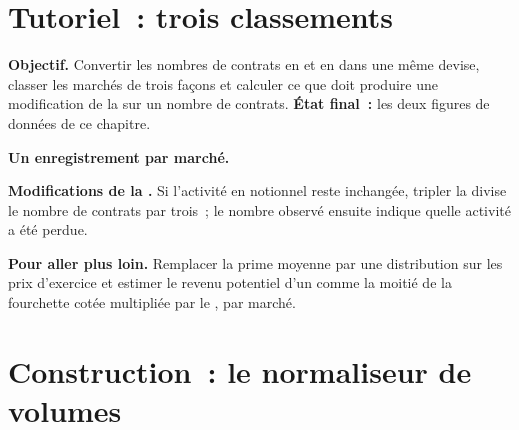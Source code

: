 \section{Tutoriel~: trois classements}\label{tut:m1:options-markets-europe-asia:rankings}

\begin{tutorial}
\textbf{Objectif.} Convertir les nombres de contrats en  et en 
dans une même devise, classer les marchés de trois façons et calculer ce que doit produire une modification
de la  sur un nombre de contrats. \textbf{État final~:} les deux figures de données
de ce chapitre.
\begin{tutsteps}
\item \textbf{Un enregistrement par marché.}
\label{lst:m1:options-markets-europe-asia:stats}
\item \textbf{Modifications de la .} Si l'activité en notionnel reste inchangée, tripler la
 divise le nombre de contrats par trois~; le nombre observé ensuite indique
quelle activité a été perdue.
\label{lst:m1:options-markets-europe-asia:lot}
\end{tutsteps}
\textbf{Pour aller plus loin.} Remplacer la prime moyenne par une distribution
sur les prix d'exercice et estimer le revenu potentiel d'un  comme la moitié de la fourchette cotée
multipliée par le , par marché.
\end{tutorial}

\section{Construction~: le normaliseur de volumes}\label{bld:m1:options-markets-europe-asia:turnover}

